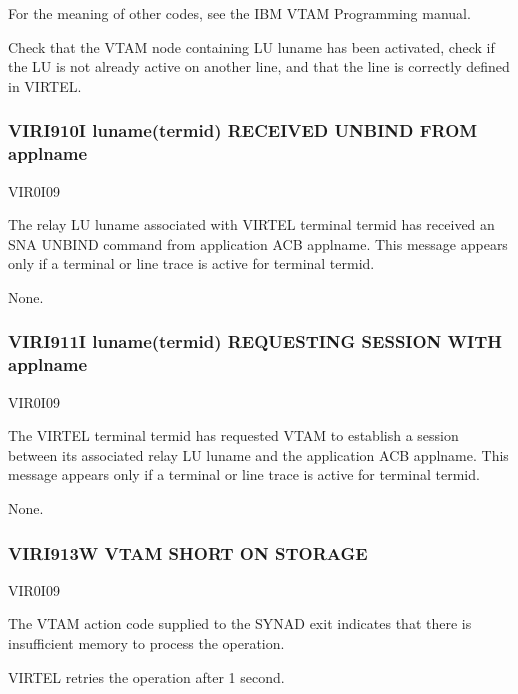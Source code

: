 \documentclass[letterpaper,10pt,english]{sphinxmanual}
\begin{document}
\sphinxAtStartPar
For the meaning of other codes, see the IBM VTAM Programming manual.
\begin{description}
\sphinxAtStartPar
Check that the VTAM node containing LU luname has been activated, check if the LU is not already active on another line, and that the line is correctly defined in VIRTEL.

\end{description}


\subsubsection{VIRI910I luname(termid) RECEIVED UNBIND FROM applname}
\label{\detokenize{messages:viri910i-luname-termid-received-unbind-from-applname}}\begin{description}
\sphinxAtStartPar
VIR0I09

\sphinxAtStartPar
The relay LU luname associated with VIRTEL terminal termid has received an SNA UNBIND command from application ACB applname. This message appears only if a terminal or line trace is active for terminal termid.

\sphinxAtStartPar
None.

\end{description}


\subsubsection{VIRI911I luname(termid) REQUESTING SESSION WITH applname}
\label{\detokenize{messages:viri911i-luname-termid-requesting-session-with-applname}}\begin{description}
\sphinxAtStartPar
VIR0I09

\sphinxAtStartPar
The VIRTEL terminal termid has requested VTAM to establish a session between its associated relay LU luname and the application ACB applname. This message appears only if a terminal or line trace is active for terminal termid.

\sphinxAtStartPar
None.

\end{description}


\subsubsection{VIRI913W VTAM SHORT ON STORAGE}
\label{\detokenize{messages:viri913w-vtam-short-on-storage}}\begin{description}
\sphinxAtStartPar
VIR0I09

\sphinxAtStartPar
The VTAM action code supplied to the SYNAD exit indicates that there is insufficient memory to process the operation.

\sphinxAtStartPar
VIRTEL retries the operation after 1 second.

\end{description}
\end{document}
